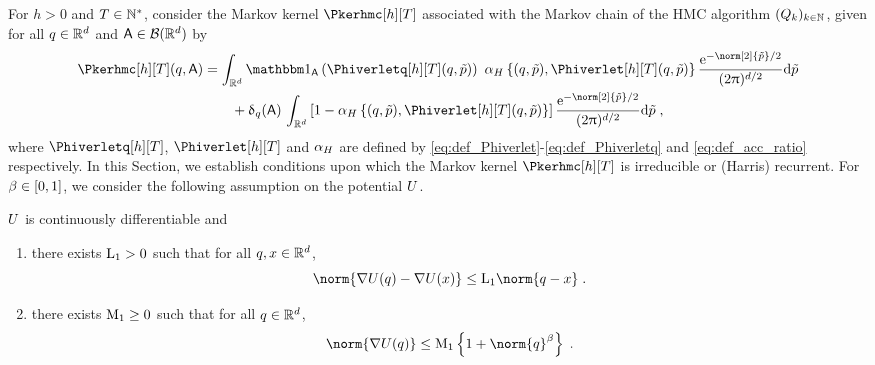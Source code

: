 

For $h >0$ and $T \in \mathbb{N}^*$, consider the Markov kernel $\Pkerhmc[h][T]$ associated with the Markov chain of the HMC algorithm $(Q_k)_{k \in \mathbb{N}}$, given for all $q \in \mathbb{R}^d$ and $\mathsf{A} \in \mathcal{B}(\mathbb{R}^d)$ by
\begin{align}
  \Pkerhmc[h][T](\q, \eventA) &= \int_{\rset^d} \indi{\eventA}{\Phiverletq[h][T](\q,\tilde{\p})} \ \alphaacc\defEns{(\q,\tilde{\p}),\Phiverlet[h][T](\q,\tilde{\p})}\frac{\rme^{-\norm[2]{\tilde{\p}}/2}}{ (2 \uppi)^{d/2}}  \rmd \tilde{\p}
                                  \nonumber
  \\
&\qquad + \updelta_{\q}(\eventA)  \,   \int_{\rset^d}  \parentheseDeux{1-\alphaacc\defEns{(\q,\tilde{\p}),\Phiverlet[h][T](\q,\tilde{\p})}} \frac{\rme^{-\norm[2]{\tilde{\p}}/2}}{ (2 \uppi)^{d/2}}  \rmd \tilde{\p} \eqsp,
 \label{eq:def_kernel_hmc}
\end{align}
where $\Phiverletq[h][T]$, $\Phiverlet[h][T]$ and $\alpha_{H}$ are defined by \eqref{eq:def_Phiverlet}-\eqref{eq:def_Phiverletq} and \eqref{eq:def_acc_ratio} respectively.
In this Section, we establish conditions upon which the Markov kernel $ \Pkerhmc[h][T]$ is irreducible or
(Harris) recurrent. %
For
$\beta \in \left[0,1\right]$, we consider the following assumption on
the potential $U$.

\begin{assumption}[$\expozero$]
  \label{assum:regOne}
  $U$ is continuously differentiable and
  \begin{enumerate}[label=(\roman*)]
  \item
  \label{assum:regOne_a}
 there exists $\mathrm{L}_1 > 0$  such that for all $q,x \in \mathbb{R}^d$,
\begin{equation}
\norm{\nabla \F(\q) - \nabla \F(x)} \leq \constzero\norm{\q-x} \eqsp.
  \end{equation}
\item    \label{assum:regOne_b}
there exists $\mathrm{M}_1 \geq 0$  such that for all $q \in \mathbb{R}^d$,
\begin{equation}
  \norm{\nabla \F(\q)} \leq \constzeroT\defEns{ 1 + \norm{\q}^{\expozero}} \eqsp.
\end{equation}
  \end{enumerate}
\end{assumption}


